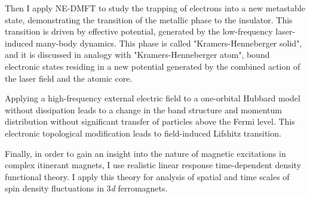 Then I apply NE-DMFT to study the trapping of electrons into a new metastable state, demonstrating the transition of the metallic phase to the insulator. This transition is driven by effective potential, generated by the low-frequency laser-induced many-body dynamics. This phase is called "Kramers-Henneberger solid", and it is discussed in analogy with "Kramers-Henneberger atom", bound electronic states residing in a new potential generated by the combined action of the laser field and 
the atomic core.

Applying a high-frequency external electric field to a one-orbital Hubbard model without dissipation leads to a change in the band structure and momentum distribution without significant transfer of particles above the Fermi level. This electronic topological modification leads to field-induced Lifshitz transition. 

Finally, in order to gain an insight into the nature of magnetic excitations in complex itinerant magnets, I use realistic linear response time-dependent density functional theory. I apply this theory for analysis of spatial and time scales of spin density fluctuations in 3\emph{d} ferromagnets.











\newpage


\tableofcontents



